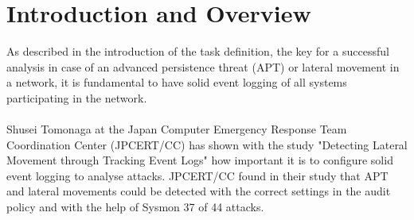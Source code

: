 \section{Introduction and Overview}
As described in the introduction of the task definition, the key for a successful analysis in case of an advanced persistence threat (APT) or lateral movement in a network, it is fundamental to have solid event logging of all systems participating in the network.
\\\\
Shusei Tomonaga at the Japan Computer Emergency Response Team Coordination Center (JPCERT/CC) has shown with the study "Detecting Lateral Movement through Tracking Event Logs" \cite{JPCERTDetectingLateralMovement} how important it is to configure solid event logging to analyse attacks. JPCERT/CC found in their study that APT and lateral movements could be detected with the correct settings in the audit policy and with the help of Sysmon 37 of 44 attacks.